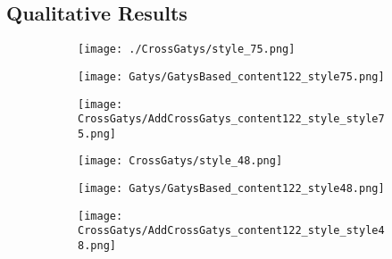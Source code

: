 \documentclass[runningheads]{llncs}
\begin{document}


\subsection{Qualitative Results}\label{sec:mul}


\begin{figure}[!htbp]
  \centering
  \begin{subfigure}[b]{0.3\linewidth}
    \texttt{[image: ./CrossGatys/style\_75.png]}
  \end{subfigure}
  \begin{subfigure}[b]{0.3\linewidth}
    \texttt{[image: Gatys/GatysBased\_content122\_style75.png]}
  \end{subfigure}
  \begin{subfigure}[b]{0.3\linewidth}
    \texttt{[image: CrossGatys/AddCrossGatys\_content122\_style\_style75.png]}
  \end{subfigure}

  \begin{subfigure}[b]{0.3\linewidth}
    \texttt{[image: CrossGatys/style\_48.png]}
  \end{subfigure}
  \begin{subfigure}[b]{0.3\linewidth}
    \texttt{[image: Gatys/GatysBased\_content122\_style48.png]}
  \end{subfigure}
  \begin{subfigure}[b]{0.3\linewidth}
    \texttt{[image: CrossGatys/AddCrossGatys\_content122\_style\_style48.png]}
  \end{subfigure}


\end{figure}
\end{document}
